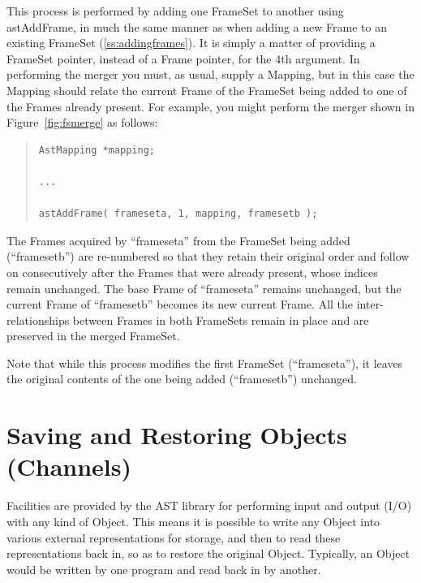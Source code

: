 \documentclass[twoside,11pt]{article}
\newcommand{\htmlref}[2]{#1}
\newcommand{\secref}[1]{\S\ref{#1}}
\renewcommand{\secref}[1]{\ref{#1}}
\begin{document}
This process is performed by adding one FrameSet to another using
astAddFrame, in much the same manner as when adding a new Frame to an
existing FrameSet (\secref{ss:addingframes}). It is simply a matter of
providing a FrameSet pointer, instead of a Frame pointer, for the 4th
argument. In performing the merger you must, as usual, supply a
Mapping, but in this case the Mapping should relate the current Frame
of the FrameSet being added to one of the Frames already present. For
example, you might perform the merger shown in
Figure~\ref{fig:fsmerge} as follows:

\begin{quote}
\small
\begin{verbatim}
AstMapping *mapping;

...

astAddFrame( frameseta, 1, mapping, framesetb );
\end{verbatim}
\normalsize
\end{quote}

The Frames acquired by ``frameseta'' from the FrameSet being added
(``framesetb'') are re-numbered so that they retain their original
order and follow on consecutively after the Frames that were already
present, whose indices remain unchanged. The base Frame of
``frameseta'' remains unchanged, but the current Frame of
``framesetb'' becomes its new current Frame. All the
inter-relationships between Frames in both FrameSets remain in place
and are preserved in the merged FrameSet.

Note that while this process modifies the first FrameSet
(``frameseta''), it leaves the original contents of the one being
added (``framesetb'') unchanged.


\cleardoublepage
\section{\label{ss:channels}Saving and Restoring Objects (Channels)}

Facilities are provided by the AST library for performing input and
output (I/O) with any kind of \htmlref{Object}{Object}. This means it is possible
to write any Object into various external representations for
storage, and then to read these representations back in, so as to
restore the original Object. Typically, an Object would be written by
one program and read back in by another.
\end{document}
